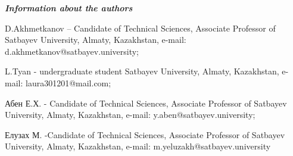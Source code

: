 \emph{{\bfseries Information about the authors}}

\begin{noparindent}
D.Akhmetkanov -- Candidate of Technical Sciences, Associate Professor of
Satbayev University, Almaty, Kazakhstan, e-mail:
d.akhmetkanov@satbayev.university;

L.Tyan - undergraduate student Satbayev University, Almaty, Kazakhstan,
e-mail: laura301201@mail.com;

Абен Е.Х. - Candidate of Technical Sciences, Associate Professor of
Satbayev University, Almaty, Kazakhstan, e-mail:
y.aben@satbayev.university;

Елузах М. -Candidate of Technical Sciences, Associate Professor of
Satbayev University, Almaty, Kazakhstan, e-mail:
m.yeluzakh@satbayev.university
\end{noparindent}

